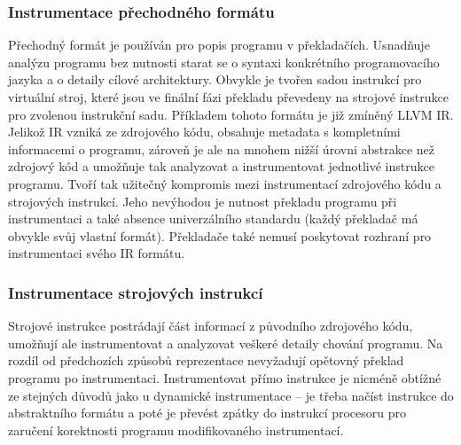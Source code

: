 \subsubsection*{Instrumentace přechodného formátu}
Přechodný formát je používán pro popis programu v překladačích. Usnadňuje analýzu programu bez nutnosti starat se o syntaxi konkrétního programovacího jazyka a o detaily cílové architektury. Obvykle je tvořen sadou instrukcí pro virtuální stroj, které jsou ve finální fázi překladu převedeny na strojové instrukce pro zvolenou instrukční sadu. Příkladem tohoto formátu je již zmíněný LLVM IR. Jelikož IR vzniká ze zdrojového kódu, obsahuje metadata s kompletními informacemi o programu, zároveň je ale na mnohem nižší úrovni abstrakce než zdrojový kód a umožňuje tak analyzovat a instrumentovat jednotlivé instrukce programu. Tvoří tak užitečný kompromis mezi instrumentací zdrojového kódu a strojových instrukcí. Jeho nevýhodou je nutnost překladu programu při instrumentaci a také absence univerzálního standardu (každý překladač má obvykle svůj vlastní formát). Překladače také nemusí poskytovat rozhraní pro instrumentaci svého IR formátu.

\subsubsection*{Instrumentace strojových instrukcí}
Strojové instrukce postrádají část informací z původního zdrojového kódu, umožňují ale instrumentovat a analyzovat veškeré detaily chování programu. Na rozdíl od předchozích způsobů reprezentace nevyžadují opětovný překlad programu po instrumentaci. Instrumentovat přímo instrukce je nicméně obtížné ze stejných důvodů jako u dynamické instrumentace -- je třeba načíst instrukce do abstraktního formátu a poté je převést zpátky do instrukcí procesoru pro zaručení korektnosti programu modifikovaného instrumentací.
